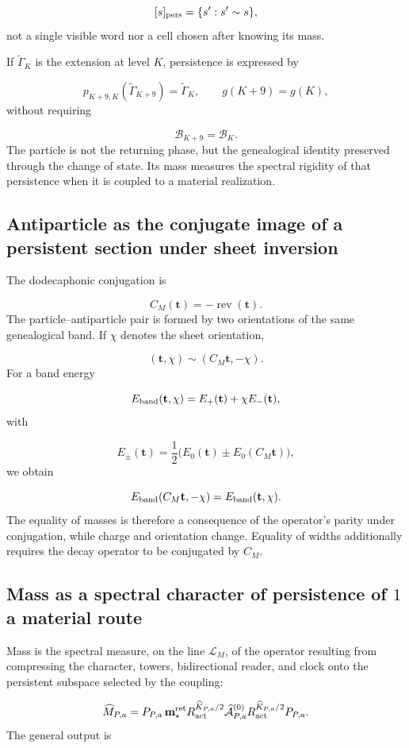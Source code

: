 \[
 [s]_{\rm pers}
 =\{s':s'\sim s\},
\]
not a single visible word nor a cell chosen after knowing its mass.

If \(\widetilde\Gamma_K\) is the extension at level \(K\), persistence is expressed by

\[
 p_{K+9,K}(\widetilde\Gamma_{K+9})
 =\widetilde\Gamma_K,\qquad
 g(K+9)=g(K),
\]
without requiring

\[
 \mathcal B_{K+9}=\mathcal B_K.
\]
The particle is not the returning phase, but the genealogical identity preserved through the change of state. Its mass measures the spectral rigidity of that persistence when it is coupled to a material realization.

\subsection{Antiparticle as the conjugate image of a persistent section under sheet inversion}
The dodecaphonic conjugation is

\[
 C_M(\mathbf t)=-\operatorname{rev}(\mathbf t).
\]
The particle--antiparticle pair is formed by two orientations of the same genealogical band. If \(\chi\) denotes the sheet orientation,

\[
 (\mathbf t,\chi)\sim(C_M\mathbf t,-\chi).
\]
For a band energy

\[
 E_{\rm band}(\mathbf t,\chi)
 =E_+(\mathbf t)+\chi E_-(\mathbf t),
\]
with

\[
 E_\pm(\mathbf t)
 =\frac12\bigl(E_0(\mathbf t)\pm E_0(C_M\mathbf t)\bigr),
\]
we obtain

\[
 E_{\rm band}(C_M\mathbf t,-\chi)
 =E_{\rm band}(\mathbf t,\chi).
\]
The equality of masses is therefore a consequence of the operator's parity under conjugation, while charge and orientation change. Equality of widths additionally requires the decay operator to be conjugated by \(C_M\).

\subsection{Mass as a spectral character of persistence of \(1\) a material route}
Mass is the spectral measure, on the line \(\mathcal L_M\), of the operator resulting from compressing the character, towers, bidirectional reader, and clock onto the persistent subspace selected by the coupling:

\[
 \widehat M_{P,a}
 =P_{P,a}\,
 \mathbf m_\star^{\rm ret}
 R_{\rm act}^{\widehat K_{P,a}/2}
 \widehat{\mathcal A}_{P,a}^{(0)}
 R_{\rm act}^{\widehat K_{P,a}/2}
 P_{P,a}.
\]
The general output is

